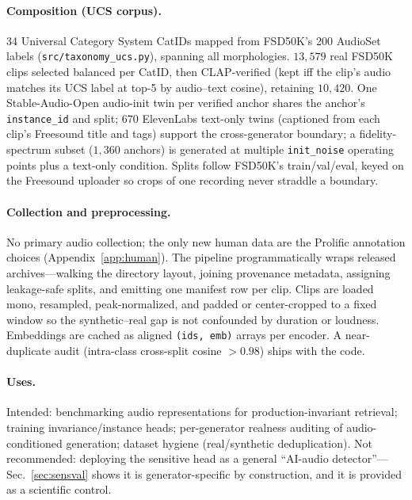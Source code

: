 \documentclass{article}
\begin{document}
\paragraph{Composition (UCS corpus).} 34 Universal Category System CatIDs mapped from FSD50K's 200
AudioSet labels (\texttt{src/taxonomy\_ucs.py}), spanning all morphologies. $13{,}579$ real FSD50K
clips selected balanced per CatID, then CLAP-verified (kept iff the clip's audio matches its UCS
label at top-5 by audio--text cosine), retaining $10{,}420$. One Stable-Audio-Open audio-init twin
per verified anchor shares the anchor's \texttt{instance\_id} and split; $670$ ElevenLabs text-only
twins (captioned from each clip's Freesound title and tags) support the cross-generator boundary;
a fidelity-spectrum subset ($1{,}360$ anchors) is generated at multiple \texttt{init\_noise}
operating points plus a text-only condition. Splits follow FSD50K's train/val/eval, keyed on the
Freesound uploader so crops of one recording never straddle a boundary.

\paragraph{Collection and preprocessing.} No primary audio collection; the only new human data are the Prolific annotation choices (Appendix~\ref{app:human}). The pipeline programmatically
wraps released archives---walking the directory layout, joining provenance metadata, assigning
leakage-safe splits, and emitting one manifest row per clip. Clips are loaded mono, resampled,
peak-normalized, and padded or center-cropped to a fixed window so the synthetic--real gap is not
confounded by duration or loudness. Embeddings are cached as aligned \texttt{(ids, emb)} arrays per
encoder. A near-duplicate audit (intra-class cross-split cosine $>0.98$) ships with the code.

\paragraph{Uses.} Intended: benchmarking audio representations for production-invariant retrieval;
training invariance/instance heads; per-generator realness auditing of audio-conditioned
generation; dataset hygiene (real/synthetic deduplication). Not recommended: deploying the
sensitive head as a general ``AI-audio detector''---Sec.~\ref{sec:sensval} shows it is
generator-specific by construction, and it is provided as a scientific control.
\end{document}

